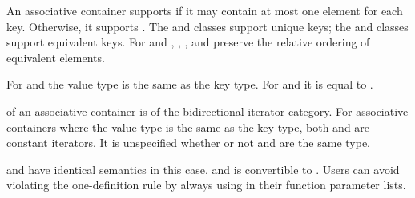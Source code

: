 \pnum
An associative container supports  if it may contain at
most one element for each key. Otherwise, it supports .
The  and  classes support unique keys; the 
and  classes support equivalent keys.
For  and ,
, , and  preserve the relative ordering
of equivalent elements.

\pnum
For  and  the value type is the same as the key type.
For  and  it is equal to .

\pnum
{}
of an associative container is of the bidirectional iterator category.
For associative containers where the value type is the same as the key type, both
and
are constant iterators. It is unspecified whether or not
and
are the same type.
\begin{note}
 and  have identical semantics in this case, and  is convertible to . Users can avoid violating the one-definition rule by always using  in their function parameter lists.
\end{note}

